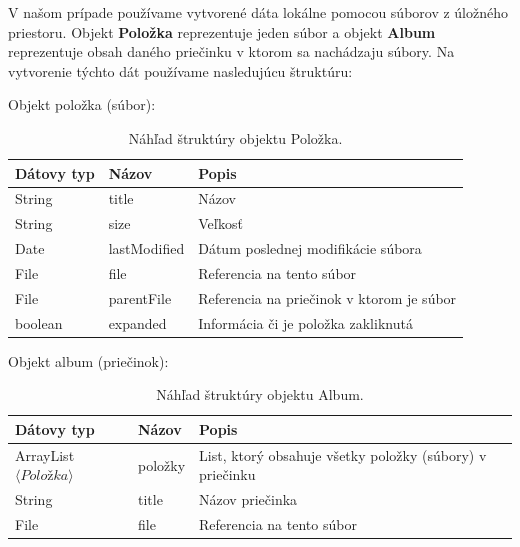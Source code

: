 \documentclass[12pt, oneside]{book}
\begin{document}
\hspace{15pt} V našom prípade používame vytvorené dáta lokálne pomocou súborov z úložného priestoru. Objekt \textbf{Položka} reprezentuje jeden súbor a objekt \textbf{Album} reprezentuje obsah daného priečinku v ktorom sa nachádzaju súbory. Na vytvorenie týchto dát používame nasledujúcu štruktúru: 
\begin{table}[H]

Objekt položka (súbor):
\begin{center}
\begin{tabularx}{1\textwidth} { 
  | >{\raggedright\arraybackslash}X 
  | >{\raggedright\arraybackslash}X 
  | >{\raggedright\arraybackslash}X | }
  \hline
 \textbf{Dátovy typ}  & \textbf{Názov} & \textbf{Popis} \\
 \hline
String & title & Názov \\
 \hline
String  & size & Veľkosť  \\
 \hline
Date  & lastModified & Dátum poslednej modifikácie súbora  \\
 \hline
File  & file & Referencia na tento súbor  \\
  \hline
File  & parentFile & Referencia na priečinok v ktorom je súbor  \\
\hline
boolean  & expanded & Informácia či je položka zakliknutá  \\
\hline

\end{tabularx}
\caption{Náhľad štruktúry objektu Položka. }
\end{center}
\end{table}

\begin{table}[H]

Objekt album (priečinok):
\begin{center}
\begin{tabularx}{1\textwidth} { 
  | >{\raggedright\arraybackslash}X 
  | >{\raggedright\arraybackslash}X 
  | >{\raggedright\arraybackslash}X | }
  \hline
 \textbf{Dátovy typ}  & \textbf{Názov} & \textbf{Popis} \\
 \hline
ArrayList$\langle Položka \rangle$ & položky & List, ktorý obsahuje všetky položky (súbory) v priečinku \\
 \hline
String  & title & Názov priečinka  \\
 \hline
File  & file & Referencia na tento súbor  \\
  \hline


\end{tabularx}
\caption{Náhľad štruktúry objektu Album. }
\end{center}
\end{table}
\end{document}
